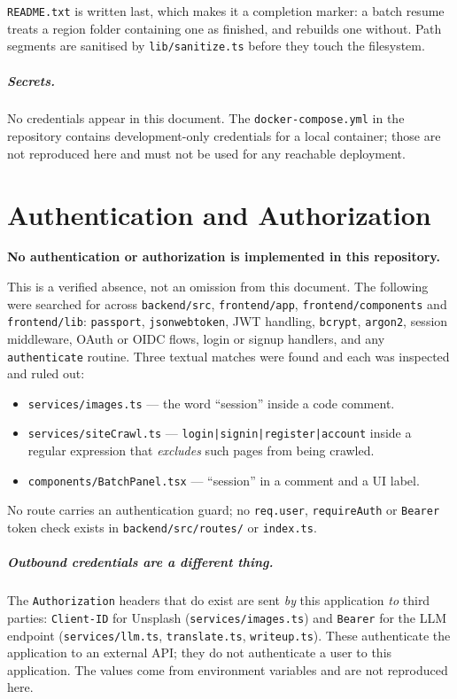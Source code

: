\documentclass[11pt,a4paper]{report}
\newcommand{\code}[1]{\texttt{\small #1}}
\DeclareRobustCommand{\file}[1]{{\small\nolinkurl{#1}}}
\begin{document}
\code{README.txt} is written last, which makes it a completion marker: a batch
resume treats a region folder containing one as finished, and rebuilds one
without. Path segments are sanitised by \file{lib/sanitize.ts} before they touch
the filesystem.

\paragraph{Secrets.} No credentials appear in this document. The
\file{docker-compose.yml} in the repository contains development-only credentials
for a local container; those are not reproduced here and must not be used for any
reachable deployment.

\chapter{Authentication and Authorization}
\label{sec:auth}

\textbf{No authentication or authorization is implemented in this repository.}

This is a verified absence, not an omission from this document. The following
were searched for across \file{backend/src}, \file{frontend/app},
\file{frontend/components} and \file{frontend/lib}: \code{passport},
\code{jsonwebtoken}, JWT handling, \code{bcrypt}, \code{argon2}, session
middleware, OAuth or OIDC flows, login or signup handlers, and any
\code{authenticate} routine. Three textual matches were found and each was
inspected and ruled out:

\begin{itemize}
\item \file{services/images.ts} --- the word ``session'' inside a code comment.
\item \file{services/siteCrawl.ts} --- \code{login|signin|register|account} inside
a regular expression that \emph{excludes} such pages from being crawled.
\item \file{components/BatchPanel.tsx} --- ``session'' in a comment and a UI label.
\end{itemize}

No route carries an authentication guard; no \code{req.user},
\code{requireAuth} or \code{Bearer} token check exists in
\file{backend/src/routes/} or \file{index.ts}.

\paragraph{Outbound credentials are a different thing.} The \code{Authorization}
headers that do exist are sent \emph{by} this application \emph{to} third parties:
\code{Client-ID} for Unsplash (\file{services/images.ts}) and \code{Bearer} for
the LLM endpoint (\file{services/llm.ts}, \file{translate.ts},
\file{writeup.ts}). These authenticate the application to an external API; they
do not authenticate a user to this application. The values come from environment
variables and are not reproduced here.
\end{document}
